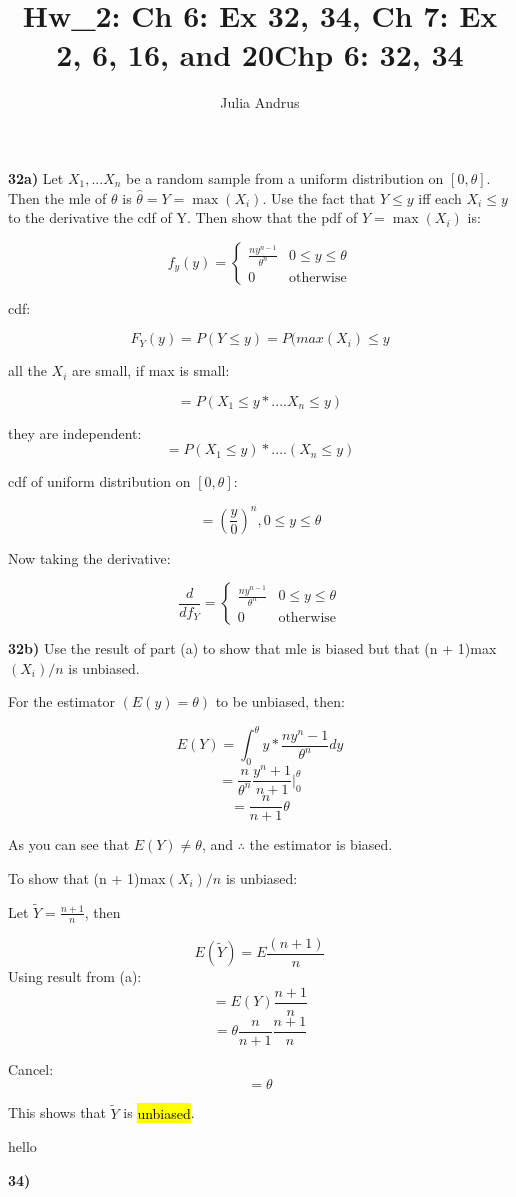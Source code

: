 \documentclass{article}
\title{Hw\_2: Ch 6: Ex 32, 34, Ch 7: Ex 2, 6, 16, and 20}
\author{Julia Andrus}
\date{}
\begin{document}
\maketitle

\title{\textbf{Chp 6: 32, 34}}

\vspace{2mm}

\textbf{32a)} Let $X_{1},...X_{n}$ be a random sample from a uniform distribution on $[0,\theta]$. Then the mle of       $\theta$ is $\hat{\theta}=Y=\max(X_{i})$. Use the fact that $Y \le y$ iff each $X_{i} \le y$ to the derivative the cdf of Y. Then show that the pdf of $Y=\max(X_{i})$ is: 

 $$f_{y}(y)=
\begin{cases}
 \frac{ny^{n-1}}{\theta^{n}} & 0\le y \le \theta \\
 0 & \text{otherwise} 
\end{cases}$$ 

cdf:

$$F_{Y}(y)=P(Y \le y)=P(max(X_{i}) \le y$$

all the $X_{i}$ are small, if max is small:

$$=P(X_{1} \le y *....X_{n} \le y)$$

they are independent:
$$=P(X_{1} \le y) *....(X_{n} \le y)$$

cdf of uniform distribution on $[0,\theta]$:

$$=(\frac{y}{0})^{n},  0\le y \le \theta$$

Now taking the derivative:

$$\frac{d}{df_{Y}}=
\begin{cases}
 \frac{ny^{n-1}}{\theta^{n}} & 0\le y \le \theta \\
 0 & \text{otherwise} 
\end{cases}$$ 


\newpage


\textbf{32b)} Use the result of part (a) to show that mle is biased but that (n + 1)max$(X_{i})/n$ is unbiased.

For the estimator $(E(y)=\theta)$ to be unbiased, then: 

$$E(Y)=\int_{0}^{\theta} y * \frac{ny^n-1}{\theta^n} dy$$
$$=\frac{n}{\theta^n}\frac{y^n+1}{n+1}|_{0}^{\theta}$$
$$=\frac{n}{n+1}\theta$$

As you can see that $E(Y) \neq \theta$, and $\therefore$ the estimator is biased.

\vspace{3mm}

To show that (n + 1)max$(X_{i})/n$ is unbiased:

Let $\tilde{Y}=\frac{n+1}{n}$, then

$$E(\tilde{Y})=E\frac{(n+1)}{n}$$
Using result from (a):
$$=E(Y)\frac{n+1}{n}$$
$$=\theta \frac{n}{n+1}\frac{n+1}{n}$$

Cancel:
$$=\theta$$

This shows that $\tilde{Y}$ is \hl{unbiased}.







\newpage

hello


\textbf{34)}
\end{document}

